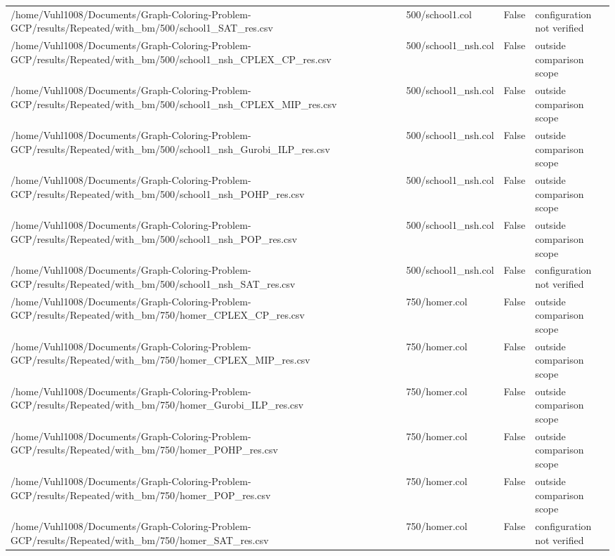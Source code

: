 \begin{table}[htbp]
\begin{tabular}{llll}
/home/Vuhl1008/Documents/Graph-Coloring-Problem-GCP/results/Repeated/with\_bm/500/school1\_SAT\_res.csv & 500/school1.col & False & configuration not verified \\
/home/Vuhl1008/Documents/Graph-Coloring-Problem-GCP/results/Repeated/with\_bm/500/school1\_nsh\_CPLEX\_CP\_res.csv & 500/school1\_nsh.col & False & outside comparison scope \\
/home/Vuhl1008/Documents/Graph-Coloring-Problem-GCP/results/Repeated/with\_bm/500/school1\_nsh\_CPLEX\_MIP\_res.csv & 500/school1\_nsh.col & False & outside comparison scope \\
/home/Vuhl1008/Documents/Graph-Coloring-Problem-GCP/results/Repeated/with\_bm/500/school1\_nsh\_Gurobi\_ILP\_res.csv & 500/school1\_nsh.col & False & outside comparison scope \\
/home/Vuhl1008/Documents/Graph-Coloring-Problem-GCP/results/Repeated/with\_bm/500/school1\_nsh\_POHP\_res.csv & 500/school1\_nsh.col & False & outside comparison scope \\
/home/Vuhl1008/Documents/Graph-Coloring-Problem-GCP/results/Repeated/with\_bm/500/school1\_nsh\_POP\_res.csv & 500/school1\_nsh.col & False & outside comparison scope \\
/home/Vuhl1008/Documents/Graph-Coloring-Problem-GCP/results/Repeated/with\_bm/500/school1\_nsh\_SAT\_res.csv & 500/school1\_nsh.col & False & configuration not verified \\
/home/Vuhl1008/Documents/Graph-Coloring-Problem-GCP/results/Repeated/with\_bm/750/homer\_CPLEX\_CP\_res.csv & 750/homer.col & False & outside comparison scope \\
/home/Vuhl1008/Documents/Graph-Coloring-Problem-GCP/results/Repeated/with\_bm/750/homer\_CPLEX\_MIP\_res.csv & 750/homer.col & False & outside comparison scope \\
/home/Vuhl1008/Documents/Graph-Coloring-Problem-GCP/results/Repeated/with\_bm/750/homer\_Gurobi\_ILP\_res.csv & 750/homer.col & False & outside comparison scope \\
/home/Vuhl1008/Documents/Graph-Coloring-Problem-GCP/results/Repeated/with\_bm/750/homer\_POHP\_res.csv & 750/homer.col & False & outside comparison scope \\
/home/Vuhl1008/Documents/Graph-Coloring-Problem-GCP/results/Repeated/with\_bm/750/homer\_POP\_res.csv & 750/homer.col & False & outside comparison scope \\
/home/Vuhl1008/Documents/Graph-Coloring-Problem-GCP/results/Repeated/with\_bm/750/homer\_SAT\_res.csv & 750/homer.col & False & configuration not verified \\

\end{tabular}
\end{table}
